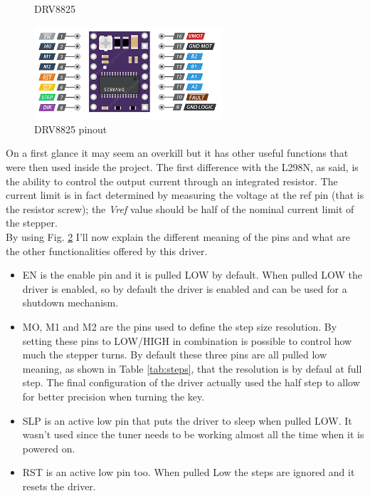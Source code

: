 \documentclass[a4paper,12pt]{article}
\begin{document}
\begin{multicols}{2}
\begin{figure}[H]
\begin{center}
        \caption{DRV8825}
        \label{fig:drv8825}
    \end{center}
\end{figure}
\begin{figure}[H]
    \begin{center}
        \includegraphics[width=7cm]{images/drv8825pinout.png}
        \caption{DRV8825 pinout}
        \label{fig:drv8825_pinout}
    \end{center}
\end{figure}
On a first glance it may seem an overkill but it has other useful functions that were then used inside the project. The first difference with the L298N, as said, is the ability to control the output current through an integrated resistor. The current limit is in fact determined by measuring the voltage at the ref pin (that is the resistor screw); the \textit{Vref} value should be half of the nominal current limit of the stepper.\\
By using Fig. \ref{fig:drv8825_pinout} I'll now explain the different meaning of the pins and what are the other functionalities offered by this driver.
\begin{itemize}
    \item EN is the enable pin and it is pulled LOW by default. When pulled LOW the driver is enabled, so by default the driver is enabled and can be used for a shutdown mechanism.
    \item MO, M1 and M2 are the pins used to define the step size resolution. By setting these pins to LOW/HIGH in combination is possible to control how much the stepper turns. By default these three pins are all pulled low meaning, as shown in Table \ref{tab:steps}, that the resolution is by defaul at full step. The final configuration of the driver actually used the half step to allow for better precision when turning the key.
    \item SLP is an active low pin that puts the driver to sleep when pulled LOW. It wasn't used since the tuner needs to be working almost all the time when it is powered on.
    \item RST is an active low pin too. When pulled Low the steps are ignored and it resets the driver.

\end{itemize}
\end{multicols}
\end{document}
